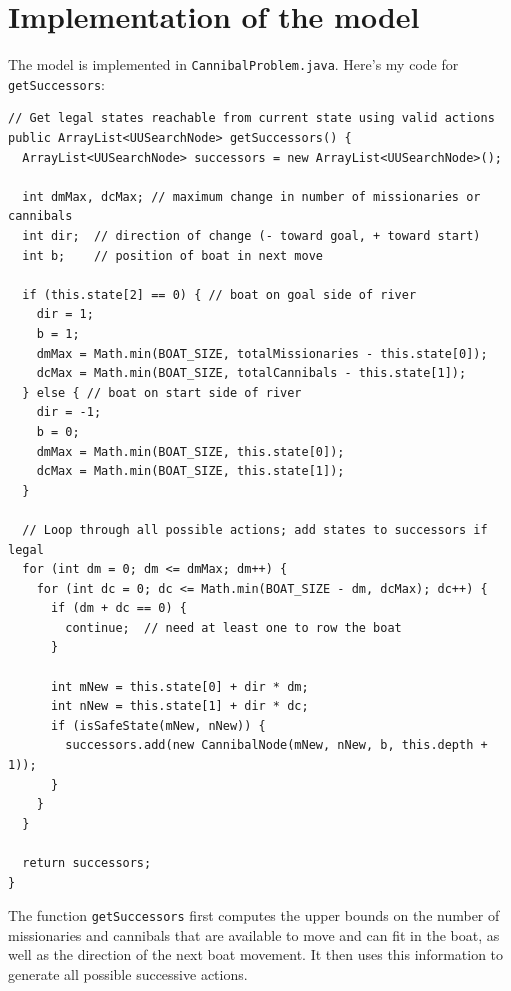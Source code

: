 \documentclass{article}
\begin{document}
\section{Implementation of the model}

The model is implemented in 
\verb`CannibalProblem.java`.  Here's my code for \verb`getSuccessors`:


\begin{lstlisting}
// Get legal states reachable from current state using valid actions
public ArrayList<UUSearchNode> getSuccessors() {
  ArrayList<UUSearchNode> successors = new ArrayList<UUSearchNode>();
  
  int dmMax, dcMax; // maximum change in number of missionaries or cannibals
  int dir;  // direction of change (- toward goal, + toward start)
  int b;    // position of boat in next move
  
  if (this.state[2] == 0) { // boat on goal side of river
    dir = 1;
    b = 1;
    dmMax = Math.min(BOAT_SIZE, totalMissionaries - this.state[0]);
    dcMax = Math.min(BOAT_SIZE, totalCannibals - this.state[1]);
  } else { // boat on start side of river
    dir = -1;
    b = 0;
    dmMax = Math.min(BOAT_SIZE, this.state[0]);
    dcMax = Math.min(BOAT_SIZE, this.state[1]);
  }
  
  // Loop through all possible actions; add states to successors if legal
  for (int dm = 0; dm <= dmMax; dm++) {
    for (int dc = 0; dc <= Math.min(BOAT_SIZE - dm, dcMax); dc++) {
      if (dm + dc == 0) {
        continue;  // need at least one to row the boat
      }
      
      int mNew = this.state[0] + dir * dm;
      int nNew = this.state[1] + dir * dc;
      if (isSafeState(mNew, nNew)) {
        successors.add(new CannibalNode(mNew, nNew, b, this.depth + 1));
      }
    }
  }
  
  return successors;
}

\end{lstlisting}
 
 \vspace{10mm}
The function \verb`getSuccessors` first computes the upper bounds on the number of missionaries and cannibals that are available to move and can fit in the boat, as well as the direction of the next boat movement. It then uses this information to generate all possible successive actions. 
\end{document}
